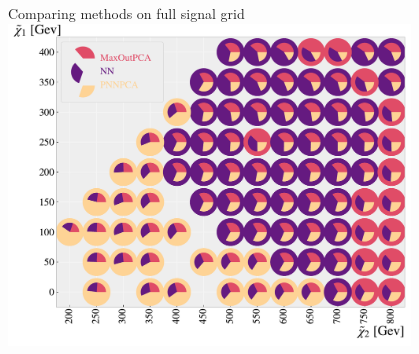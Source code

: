 \documentclass[UKenglish]{beamer}
\begin{document}
\begin{frame}{Comparing methods on full signal grid}
    \centering
    \vfill
    \includegraphics[width = 0.8\textwidth]{figures/Comps/FS_MLMNetworkComp.pdf}
\end{frame}
\end{document}
